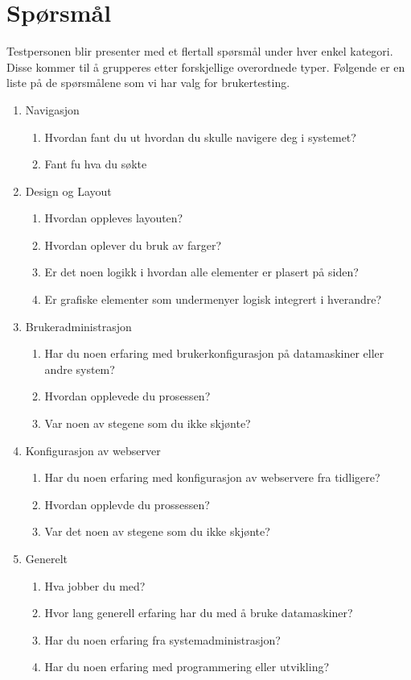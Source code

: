 \section{Spørsmål}
Testpersonen blir presenter med et flertall spørsmål under hver enkel kategori. Disse kommer til å grupperes etter forskjellige overordnede typer. Følgende er en liste på de spørsmålene som vi har valg for brukertesting.

\begin{enumerate}
\setlength{\itemsep}{1pt}
\setlength{\parskip}{0pt}
\setlength{\parsep}{0pt}
\item Navigasjon
\begin{enumerate}
\item Hvordan fant du ut hvordan du skulle navigere deg i systemet?
\item Fant fu hva du søkte 
\end{enumerate}
\item Design og Layout
\begin{enumerate}
\item Hvordan oppleves layouten?
\item Hvordan oplever du bruk av farger?
\item Er det noen logikk i hvordan alle elementer er plasert på siden?
\item Er grafiske elementer som undermenyer logisk integrert i hverandre?
\end{enumerate}
\item Brukeradministrasjon
\begin{enumerate}
\item Har du noen erfaring med brukerkonfigurasjon på datamaskiner eller andre system?
\item Hvordan opplevede du prosessen?
\item Var noen av stegene som du ikke skjønte?
\end{enumerate}
\item Konfigurasjon av webserver
\begin{enumerate}
\item Har du noen erfaring med konfigurasjon av webservere fra tidligere?
\item Hvordan opplevde du prossessen?
\item Var det noen av stegene som du ikke skjønte?
\end{enumerate}
\item Generelt
\begin{enumerate}
\item Hva jobber du med?
\item Hvor lang generell erfaring har du med å bruke datamaskiner?
\item Har du noen erfaring fra systemadministrasjon?
\item Har du noen erfaring med programmering eller utvikling?
\end{enumerate}
\end{enumerate}

